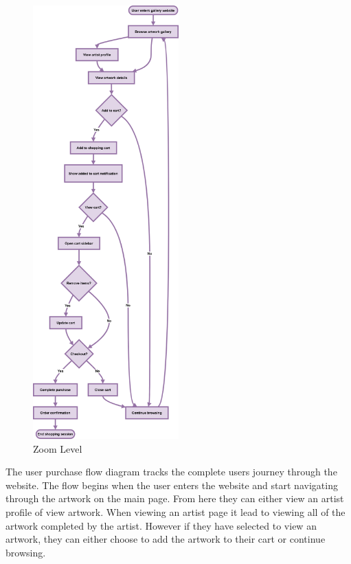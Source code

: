 \documentclass[]{project_final}
\begin{document}
\begin{figure}[ht!]
    \centering
    \includegraphics[width=0.5\textwidth]{AGUserPurchaseFlow.png}
    \vspace*{0.0cm}
    \caption{Zoom Level}
    \label{fig:1}
\end{figure}

The user purchase flow diagram tracks the complete users journey through the website. The flow begins when the user enters the website and start navigating through the artwork on the main page. From here they can either view an artist profile of view artwork. When viewing an artist page it lead to viewing all of the artwork completed by the artist. However if they have selected to view an artwork, they can either choose to add the artwork to their cart or continue browsing.
\end{document}
